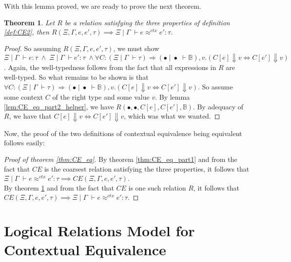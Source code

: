 \documentclass[twoside,11pt,openright]{report}
\newtheorem{theorem}{Theorem}
\theoremstyle{definition}
\newcommand{\expr}{e}
\newcommand{\val}{v}
\newcommand{\ctx}{C}
\newcommand{\Tbool}{\mathbb{B}}
\newcommand{\typ}{\tau}
\newcommand{\venv}{\Gamma}
\newcommand{\tenv}{\Xi}
\newcommand{\emptenv}{\bullet}
\newcommand{\empvenv}{\bullet}
\newcommand{\jdg}[4]{#1 \; | \; #2 \; \vdash #3 : #4}
\newcommand{\jdgType}[3]{#1 \; | \; #2 \; \vdash #3}
\newcommand{\jdgRel}[6]{#1 \; | \; #2 \; \vdash #3 \approx^{#4} #5 : #6}
\newcommand{\ctxRel}[5]{\jdgRel{#1}{#2}{#3}{ctx}{#4}{#5}}
\begin{document}
With this lemma proved, we are ready to prove the next theorem.
\begin{theorem}\label{thm:CE_eq_part2}
  Let $R$ be a relation satisfying the three properties of definition \ref{def:CE2}, then $R(\tenv, \venv, \expr, \expr', \typ) \implies \ctxRel{\tenv}{\venv}{\expr}{\expr'}{\typ}$.
\end{theorem}
\begin{proof}
  So assuming $R(\tenv, \venv, \expr, \expr', \typ)$, we must show 
  $\jdg{\tenv}{\venv}{\expr}{\typ} \; \land \; \jdg{\tenv}{\venv}{\expr'}{\typ} \; \land \forall \ctx : (\jdgType{\tenv}{\venv}{\typ}) \Rightarrow (\jdgType{\emptenv}{\empvenv}{\Tbool}), \val . (\ctx[\expr] \Downarrow \val \iff \ctx[\expr'] \Downarrow \val)$. Again, the well-typedness follows from the fact that all expressions in $R$ are well-typed. So what remains to be shown is that $\forall \ctx : (\jdgType{\tenv}{\venv}{\typ}) \Rightarrow (\jdgType{\emptenv}{\empvenv}{\Tbool}), \val . (\ctx[\expr] \Downarrow \val \iff \ctx[\expr'] \Downarrow \val)$. So assume some context $C$ of the right type and some value $\val$. By lemma \ref{lem:CE_eq_part2_helper}, we have $R(\emptenv, \empvenv, C[\expr], C[\expr'], \Tbool)$. By adequacy of $R$, we have that $\ctx[\expr] \Downarrow \val \iff \ctx[\expr'] \Downarrow \val$, which was what we wanted.
\end{proof}

Now, the proof of the two definitions of contextual equivalence being equivalent follows easily:
\begin{proof}[Proof of theorem \ref{thm:CE_eq}]
  By theorem \ref{thm:CE_eq_part1} and from the fact that $CE$ is the coarsest relation satisfying the three properties, it follows that $\ctxRel{\tenv}{\venv}{\expr}{\expr'}{\typ} \implies CE(\tenv, \venv, \expr, \expr', \typ)$.\\
  By theorem \ref{thm:CE_eq_part2} and from the fact that $CE$ is one such relation $R$, it follows that $CE(\tenv, \venv, \expr, \expr', \typ) \implies \ctxRel{\tenv}{\venv}{\expr}{\expr'}{\typ}$.
\end{proof}


\chapter{Logical Relations Model for Contextual Equivalence}
\label{ch:LR}
\end{document}
